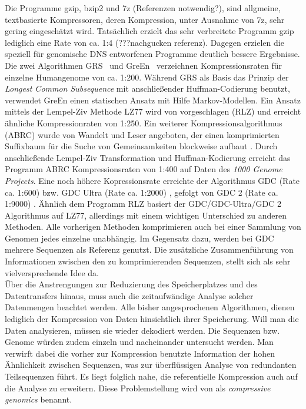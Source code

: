 \documentclass[12pt]{article}
\begin{document}
Die Programme gzip, bzip2 und 7z (Referenzen notwendig?), sind allgmeine, textbasierte Kompressoren, deren Kompression, unter Ausnahme von 7z, sehr gering eingeschätzt wird. Tatsächlich erzielt das sehr verbreitete Programm gzip lediglich eine Rate von ca. 1:4 (???nachgucken referenz).
Dagegen erzielen die speziell für genomische DNS entworfenen Programme deutlich bessere Ergebnisse. Die zwei Algorithmen GRS~\cite{wang11GRS} und GreEn~\cite{pinho12Green} verzeichnen Kompressionsraten für einzelne Humangenome von ca. 1:200. Während GRS als Basis das Prinzip der \textit{Longest Common Subsequence} mit anschließender Huffman-Codierung benutzt, verwendet GreEn einen statischen Ansatz mit Hilfe Markov-Modellen. Ein Ansatz mittels der Lempel-Ziv Methode LZ77 wird von \cite{Kuruppu:RLZ} vorgeschlagen (RLZ) und erreicht ähnliche Kompressionraten von 1:250. Ein weiterer Kompressionsalgorithmus (ABRC) wurde von Wandelt und Leser angeboten, der einen komprimierten Suffixbaum für die Suche von Gemeinsamkeiten blockweise aufbaut \cite{wandelt:ABRC}. Durch anschließende Lempel-Ziv Transformation und Huffman-Kodierung erreicht das Programm ABRC Kompressionsraten von 1:400 auf Daten des \textit{1000 Genome Projects}. Eine noch höhere Kopressionsrate erreichte der Algorithmus GDC (Rate ca. 1:600) bzw. GDC Ultra (Rate ca. 1:2000) \cite{deoriwicz:GDC}, gefolgt von GDC 2 (Rate ca. 1:9000) \cite{deoriwicz:GDC2}. Ähnlich dem Programm RLZ basiert der GDC/GDC-Ultra/GDC 2 Algorithmus auf LZ77,  allerdings mit einem wichtigen Unterschied zu anderen Methoden. Alle vorherigen Methoden komprimieren auch bei einer Sammlung von Genomen jedes einzelne unabhängig. Im Gegensatz dazu, werden bei GDC mehrere Sequenzen als Referenz genutzt. Die zusätzliche Zusammenführung von Informationen zwischen den zu komprimierenden Sequenzen, stellt sich als sehr vielversprechende Idee da.\\

Über die Anstrengungen zur Reduzierung des Speicherplatzes und des Datentransfers hinaus, muss auch die zeitaufwändige Analyse solcher Datenmengen beachtet werden. Alle bisher angesprochenen Algorithmen, dienen lediglich der Kompression von Daten hinsichtlich ihrer Speicherung. Will man die Daten analysieren, müssen sie wieder dekodiert werden. Die Sequenzen bzw. Genome würden zudem einzeln und nacheinander untersucht werden. Man verwirft dabei die vorher zur Kompression benutzte Information der hohen Ähnlichkeit zwischen Sequenzen, was zur überflüssigen Analyse von redundanten Teilsequenzen führt. Es liegt folglich nahe, die referentielle Kompression auch auf die Analyse zu erweitern. Diese Problemstellung wird von \cite{loh12compressivegenomics} als \textit{compressive genomics} benannt. 
\end{document}
